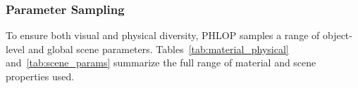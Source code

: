 \documentclass[conference]{IEEEtran}
\begin{document}




\subsubsection{Parameter Sampling}

To ensure both visual and physical diversity, PHLOP samples a range of object-level and global scene parameters. Tables~\ref{tab:material_physical} and~\ref{tab:scene_params} summarize the full range of material and scene properties used.
\end{document}

